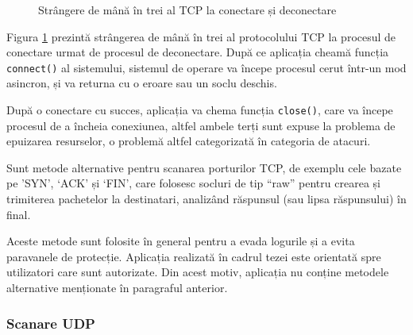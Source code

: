 	\begin{figure}[!htbp]
		\centering
		\caption{Strângere de mână în trei al TCP la conectare și deconectare}
		\label{tcp3way_ro}
	\end{figure}
	
	Figura \ref{tcp3way_ro} prezintă strângerea de mână în trei al protocolului TCP la procesul de conectare urmat de procesul de deconectare. După ce aplicația cheamă funcția \texttt{connect()} al sistemului, sistemul de operare va începe procesul cerut într-un mod asincron, și va returna cu o eroare sau un soclu deschis.
	
	După o conectare cu succes, aplicația va chema funcția \texttt{close()}, care va începe procesul de a încheia conexiunea, altfel ambele terți sunt expuse la problema de epuizarea resurselor, o problemă altfel categorizată în categoria de atacuri\cite{erickson08}.
	
	Sunt metode alternative pentru scanarea porturilor TCP, de exemplu cele bazate pe 'SYN', `ACK' și `FIN'\cite{kris07}, care folosesc socluri de tip ``raw'' pentru crearea și trimiterea pachetelor la destinatari, analizând răspunsul (sau lipsa răspunsului) în final.
	
	Aceste metode sunt folosite în general pentru a evada logurile și a evita paravanele de protecție. Aplicația realizată în cadrul tezei este orientată spre utilizatori care sunt autorizate. Din acest motiv, aplicația nu conține metodele alternative menționate în paragraful anterior.

\subsubsection*{Scanare UDP}

